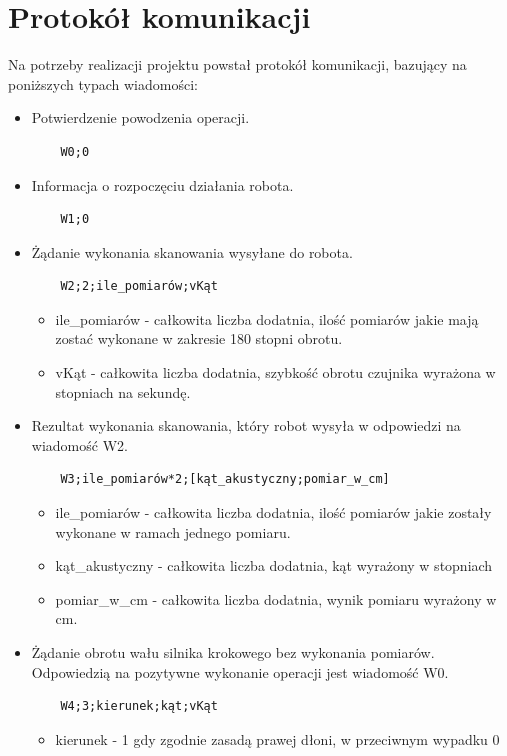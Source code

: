 \documentclass[a4paper,12pt]{article}
\begin{document}
\section{Protokół komunikacji}
Na potrzeby realizacji projektu powstał protokół komunikacji, bazujący na poniższych typach wiadomości:
\begin{itemize}
\item Potwierdzenie powodzenia operacji. 
\begin{verbatim}
	W0;0
\end{verbatim}
\item Informacja o rozpoczęciu działania robota.
\begin{verbatim}
	W1;0
\end{verbatim}
\item Żądanie wykonania skanowania wysyłane do robota.
\begin{verbatim}
	W2;2;ile_pomiarów;vKąt
\end{verbatim}
	\begin{itemize}
	\item ile\_pomiarów - całkowita liczba dodatnia, ilość pomiarów jakie mają zostać wykonane w zakresie 180 stopni obrotu.
	\item vKąt - całkowita liczba dodatnia, szybkość obrotu czujnika wyrażona w stopniach na sekundę.
	\end{itemize}
\item Rezultat wykonania skanowania, który robot wysyła w odpowiedzi na wiadomość W2.
\begin{verbatim}
	W3;ile_pomiarów*2;[kąt_akustyczny;pomiar_w_cm]
\end{verbatim}
	\begin{itemize}
	\item ile\_pomiarów - całkowita liczba dodatnia, ilość pomiarów jakie zostały wykonane w ramach jednego pomiaru. 
	\item kąt\_akustyczny - całkowita liczba dodatnia, kąt wyrażony w stopniach
	\item pomiar\_w\_cm - całkowita liczba dodatnia, wynik pomiaru wyrażony w cm.
	\end{itemize}
\item Żądanie obrotu wału silnika krokowego bez wykonania pomiarów. Odpowiedzią na pozytywne wykonanie operacji jest wiadomość W0.
\begin{verbatim}
	W4;3;kierunek;kąt;vKąt
\end{verbatim}
	\begin{itemize}
	\item kierunek - 1 gdy zgodnie zasadą prawej dłoni, w przeciwnym wypadku 0

\end{itemize}
\end{itemize}
\end{document}
